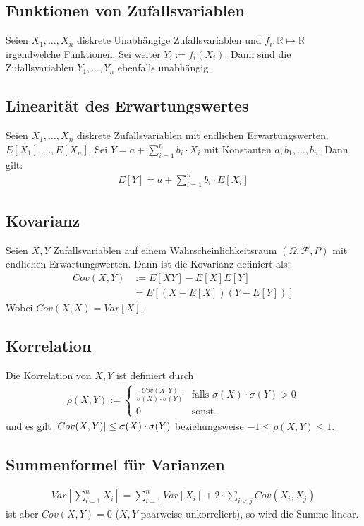 \documentclass[8pt]{extarticle}
\newcommand{\R}{\mathbb{R}}
\newcommand{\F}{\mathcal{F}}
\newcommand{\Sn}{\sum_{i = 1}^n}
\newcommand{\zufallsvariablen}{X_1, \dots, X_n}
\begin{document}
\begin{multicols*}{3}
  \subsection*{Funktionen von Zufallsvariablen}
  Seien $\zufallsvariablen$ diskrete Unabhängige Zufallsvariablen und $f_i: \R
    \mapsto \R$ irgendwelche Funktionen. Sei weiter $Y_i := f_i (X_i)$. Dann sind
  die Zufallsvariablen $Y_1, \dots, Y_n$ ebenfalls unabhängig.
  \subsection*{Linearität des Erwartungswertes}
  Seien $\zufallsvariablen$ diskrete Zufallsvariablen mit endlichen
  Erwartungswerten. $E[X_1], \dots, E[X_n]$. Sei $Y = a + \Sn b_i \cdot X_i$ mit
  Konstanten $a, b_1, \dots, b_n$. Dann gilt:
  \begin{align*}
    E[Y] = a + \Sn b_i \cdot E[X_i]
  \end{align*}
  \subsection*{Kovarianz}
  Seien $X, Y$ Zufallsvariablen auf einem Wahrscheinlichkeitsraum $ (\Omega, \F,
    P)$ mit endlichen Erwartungswerten. Dann ist die Kovarianz definiert als:
  \begin{align*}
    Cov (X, Y) & := E[XY] - E[X]E[Y]        \\
              & = E[ (X - E[X])  (Y - E[Y])]
  \end{align*}
  Wobei $Cov (X, X) = Var[X]$.
  \subsection*{Korrelation}
  Die Korrelation von $X, Y$ ist definiert durch
  \begin{align*}
    \rho (X, Y) := \begin{cases}
                    \frac{Cov (X, Y)}{\sigma (X) \cdot \sigma (Y)} & \text{falls } \sigma (X) \cdot \sigma (Y) > 0 \\
                    0                                           & \text{sonst.}
                  \end{cases}
  \end{align*}
  und es gilt $\abs{Cov (X, Y)} \leq \sigma (X) \cdot \sigma (Y)$
  beziehungsweise $-1 \leq \rho (X, Y) \leq 1$.
  \subsection*{Summenformel für Varianzen}
  \begin{align*}
    Var \left[ \Sn X_i \right] = \Sn Var[X_i] + 2 \cdot \sum_{i < j} Cov (X_i, X_j)
  \end{align*}
  ist aber $Cov (X, Y) = 0$  ($X, Y$ paarweise unkorreliert), so wird
  die Summe linear.

\end{multicols*}
\end{document}
